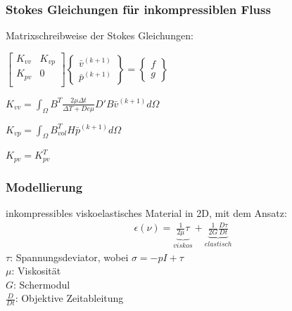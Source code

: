 \documentclass{beamer}
\begin{document}
\begin{frame}
\frametitle{Stokes Gleichungen für inkompressiblen Fluss}
Matrixschreibweise der Stokes Gleichungen: \\
\par\medskip
$\begin{bmatrix}
K_{vv} & K_{vp} \\
K_{pv} & 0 \\
\end{bmatrix}
\begin{Bmatrix}
\bar{v}^{(k+1)} \\
\bar{p}^{(k+1)}
\end{Bmatrix}
= \begin{Bmatrix}
f \\
g
\end{Bmatrix}$
\par\bigskip
$K_{vv} = \int_{\Omega} B^T \frac{2\mu \Delta t}{\Delta T + De\mu} D' B \bar{v}^{(k+1)} d\Omega$ \\
\par\smallskip
$K_{vp} = \int_{\Omega} B^T_{vol} H \bar{p}^{(k+1)} d\Omega $ \\
\par\smallskip
$K_{pv} = K_{pv}^T$
\end{frame}


\begin{frame}
	\frametitle{Modellierung}
	inkompressibles viskoelastisches Material in 2D, mit dem Ansatz:
	\begin{align*}
		\epsilon (\nu) = \underbrace{\frac{1}{2\mu}\tau}_{viskos} + \underbrace{\frac{1}{2G}\frac{D\tau}{Dt}}_{elastisch}
	\end{align*}
	$\tau$: Spannungsdeviator, wobei $\sigma = -pI+\tau$ \\
	$\mu$: Viskosität \\
	$G$: Schermodul \\
	$\frac{D}{Dt}$: Objektive Zeitableitung
\end{frame}
\end{document}
